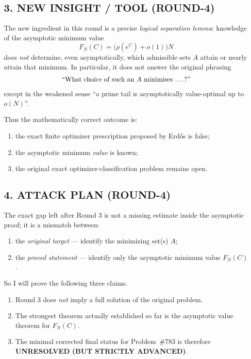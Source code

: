 \subsection*{3. NEW INSIGHT / TOOL (ROUND-4)}

The new ingredient in this round is a precise \emph{logical separation lemma}: knowledge of the asymptotic minimum value
\[
F_N(C)=\bigl(\rho(e^C)+o(1)\bigr)N
\]
does \emph{not} determine, even asymptotically, which admissible sets $A$ attain or nearly attain that minimum.  In particular, it does not answer the original phrasing
\[
\text{``What choice of such an $A$ minimises \dots ?''}
\]
except in the weakened sense ``a prime tail is asymptotically value-optimal up to $o(N)$''.

Thus the mathematically correct outcome is:

\begin{enumerate}
	\item the exact finite optimizer prescription proposed by Erd\H{o}s is false;
	\item the asymptotic minimum \emph{value} is known;
	\item the original exact optimizer-classification problem remains open.
\end{enumerate}

\subsection*{4. ATTACK PLAN (ROUND-4)}

The exact gap left after Round 3 is not a missing estimate inside the asymptotic proof; it is a mismatch between:

\begin{enumerate}
	\item the \emph{original target} --- identify the minimizing set(s) $A$;
	\item the \emph{proved statement} --- identify only the asymptotic minimum value $F_N(C)$.
\end{enumerate}

So I will prove the following three claims.

\begin{enumerate}
	\item[(i)] Round 3 does \emph{not} imply a full solution of the original problem.
	\item[(ii)] The strongest theorem actually established so far is the asymptotic value theorem for $F_N(C)$.
	\item[(iii)] The minimal corrected final status for Problem~\#783 is therefore \textbf{UNRESOLVED (BUT STRICTLY ADVANCED)}.
\end{enumerate}


